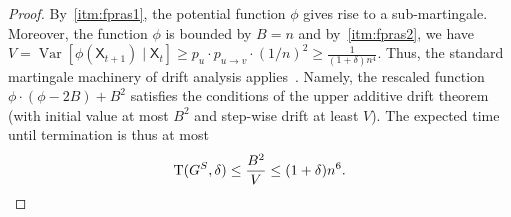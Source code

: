 \documentclass[letterpaper]{article}
\def\O{\mathcal{O}}
\newcommand{\X}{\mathsf{X}}
\newcommand{\ft}{\operatorname{T}}
\newcommand{\FitAdv}{\delta}
\begin{document}
\begin{proof}
By~\cref{itm:fpras1}, the potential function $\phi$ gives rise to a sub-martingale.
Moreover, the function $\phi$ is bounded by $B=n$ and
by~\cref{itm:fpras2}, we have $V=\operatorname{Var}[\phi(\X_{t+1})\mid \X_t]\ge p_u\cdot p_{u\to v}\cdot (1/n)^2 \ge  \frac1{(1+\FitAdv)n^4}$.
Thus, the standard martingale machinery of drift analysis applies~\cite{kotzing2019first}.
Namely, the rescaled function $\phi\cdot (\phi-2B)+B^2$ satisfies the conditions
of the upper additive drift theorem (with initial value at most $B^2$ and step-wise drift at least $V$).
The expected time until termination is thus at most
\[\ft(G^S,\FitAdv) \le \frac{B^2}{V} \le (1+\FitAdv)n^6. \qedhere
\]
\end{proof}
\end{document}
